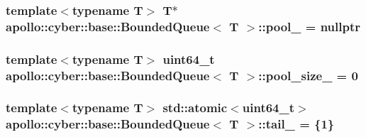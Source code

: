 \hypertarget{classapollo_1_1cyber_1_1base_1_1BoundedQueue_ab7651509420fec29fb2f9fb013bd8df3}{
\subsubsection[{pool\-\_\-}]{\setlength{\rightskip}{0pt plus 5cm}template$<$typename T$>$ T$\ast$ {\bf apollo\-::cyber\-::base\-::\-Bounded\-Queue}$<$ T $>$\-::pool\-\_\- = nullptr\hspace{0.3cm}{\ttfamily [private]}}}\label{classapollo_1_1cyber_1_1base_1_1BoundedQueue_ab7651509420fec29fb2f9fb013bd8df3}
\hypertarget{classapollo_1_1cyber_1_1base_1_1BoundedQueue_a05a534d5530191d523f8d5a976dbae31}{
\subsubsection[{pool\-\_\-size\-\_\-}]{\setlength{\rightskip}{0pt plus 5cm}template$<$typename T$>$ uint64\-\_\-t {\bf apollo\-::cyber\-::base\-::\-Bounded\-Queue}$<$ T $>$\-::pool\-\_\-size\-\_\- = 0\hspace{0.3cm}{\ttfamily [private]}}}\label{classapollo_1_1cyber_1_1base_1_1BoundedQueue_a05a534d5530191d523f8d5a976dbae31}
\hypertarget{classapollo_1_1cyber_1_1base_1_1BoundedQueue_a9b0101e530013d6587259b40a5937b2d}{
\subsubsection[{tail\-\_\-}]{\setlength{\rightskip}{0pt plus 5cm}template$<$typename T$>$ std\-::atomic$<$uint64\-\_\-t$>$ {\bf apollo\-::cyber\-::base\-::\-Bounded\-Queue}$<$ T $>$\-::tail\-\_\- = \{1\}\hspace{0.3cm}{\ttfamily [private]}}}\label{classapollo_1_1cyber_1_1base_1_1BoundedQueue_a9b0101e530013d6587259b40a5937b2d}
